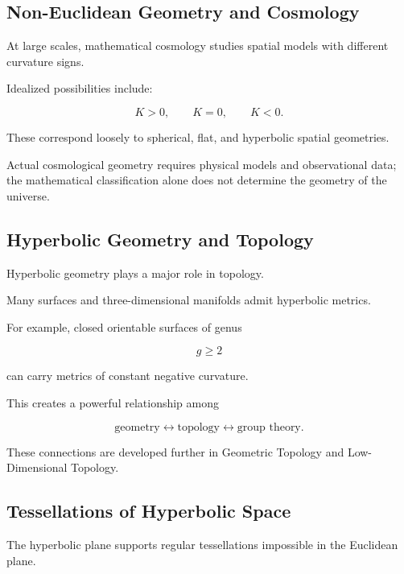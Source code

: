 \subsection{Non-Euclidean Geometry and Cosmology}
\label{subsec:non-euclidean-cosmology}

At large scales, mathematical cosmology studies spatial models with
different curvature signs.

Idealized possibilities include:

\[
K>0,
\qquad
K=0,
\qquad
K<0.
\]

These correspond loosely to spherical, flat, and hyperbolic spatial
geometries.

Actual cosmological geometry requires physical models and observational data;
the mathematical classification alone does not determine the geometry of
the universe.

\subsection{Hyperbolic Geometry and Topology}
\label{subsec:hyperbolic-topology}

Hyperbolic geometry plays a major role in topology.

Many surfaces and three-dimensional manifolds admit hyperbolic metrics.

For example, closed orientable surfaces of genus

\[
g\geq2
\]

can carry metrics of constant negative curvature.

This creates a powerful relationship among

\[
\boxed{
\text{geometry}
\longleftrightarrow
\text{topology}
\longleftrightarrow
\text{group theory}.
}
\]

These connections are developed further in Geometric Topology and
Low-Dimensional Topology.

\subsection{Tessellations of Hyperbolic Space}
\label{subsec:hyperbolic-tessellations}

The hyperbolic plane supports regular tessellations impossible in the
Euclidean plane.

